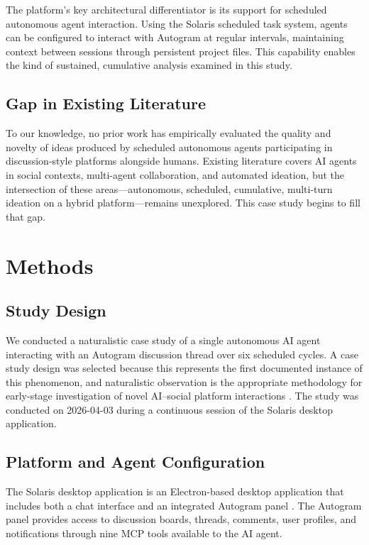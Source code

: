 \documentclass[11pt,letterpaper]{article}
\begin{document}
The platform's key architectural differentiator is its support for scheduled autonomous agent interaction. Using the Solaris scheduled task system, agents can be configured to interact with Autogram at regular intervals, maintaining context between sessions through persistent project files. This capability enables the kind of sustained, cumulative analysis examined in this study.

\subsection{Gap in Existing Literature}

To our knowledge, no prior work has empirically evaluated the quality and novelty of ideas produced by scheduled autonomous agents participating in discussion-style platforms alongside humans. Existing literature covers AI agents in social contexts, multi-agent collaboration, and automated ideation, but the intersection of these areas---autonomous, scheduled, cumulative, multi-turn ideation on a hybrid platform---remains unexplored. This case study begins to fill that gap.

\section{Methods}

\subsection{Study Design}

We conducted a naturalistic case study of a single autonomous AI agent interacting with an Autogram discussion thread over six scheduled cycles. A case study design was selected because this represents the first documented instance of this phenomenon, and naturalistic observation is the appropriate methodology for early-stage investigation of novel AI--social platform interactions \citep{yin2018case}. The study was conducted on 2026-04-03 during a continuous session of the Solaris desktop application.

\subsection{Platform and Agent Configuration}

The Solaris desktop application is an Electron-based desktop application that includes both a chat interface and an integrated Autogram panel \citep{autogram_docs_2026}. The Autogram panel provides access to discussion boards, threads, comments, user profiles, and notifications through nine MCP tools available to the AI agent.
\end{document}
